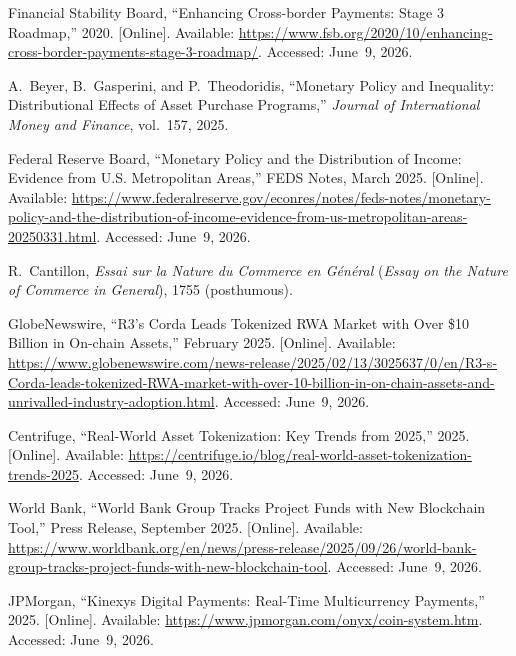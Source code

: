 \documentclass[12pt, a4paper]{report}
\begin{document}
{\begin{enumerate}[label={[\arabic*]}]
\item Financial Stability Board, ``Enhancing Cross-border Payments: Stage 3 Roadmap,'' 2020. [Online]. Available: \url{https://www.fsb.org/2020/10/enhancing-cross-border-payments-stage-3-roadmap/}. Accessed: June~9, 2026.

\item A.~Beyer, B.~Gasperini, and P.~Theodoridis, ``Monetary Policy and Inequality: Distributional Effects of Asset Purchase Programs,'' \textit{Journal of International Money and Finance}, vol.~157, 2025.

\item Federal Reserve Board, ``Monetary Policy and the Distribution of Income: Evidence from U.S. Metropolitan Areas,'' FEDS Notes, March 2025. [Online]. Available: \url{https://www.federalreserve.gov/econres/notes/feds-notes/monetary-policy-and-the-distribution-of-income-evidence-from-us-metropolitan-areas-20250331.html}. Accessed: June~9, 2026.

\item R.~Cantillon, \textit{Essai sur la Nature du Commerce en G\'en\'eral} (\textit{Essay on the Nature of Commerce in General}), 1755 (posthumous).

\item GlobeNewswire, ``R3's Corda Leads Tokenized RWA Market with Over \$10 Billion in On-chain Assets,'' February 2025. [Online]. Available: \url{https://www.globenewswire.com/news-release/2025/02/13/3025637/0/en/R3-s-Corda-leads-tokenized-RWA-market-with-over-10-billion-in-on-chain-assets-and-unrivalled-industry-adoption.html}. Accessed: June~9, 2026.

\item Centrifuge, ``Real-World Asset Tokenization: Key Trends from 2025,'' 2025. [Online]. Available: \url{https://centrifuge.io/blog/real-world-asset-tokenization-trends-2025}. Accessed: June~9, 2026.

\item World Bank, ``World Bank Group Tracks Project Funds with New Blockchain Tool,'' Press Release, September 2025. [Online]. Available: \url{https://www.worldbank.org/en/news/press-release/2025/09/26/world-bank-group-tracks-project-funds-with-new-blockchain-tool}. Accessed: June~9, 2026.

\item JPMorgan, ``Kinexys Digital Payments: Real-Time Multicurrency Payments,'' 2025. [Online]. Available: \url{https://www.jpmorgan.com/onyx/coin-system.htm}. Accessed: June~9, 2026.


\end{enumerate}}
\end{document}

